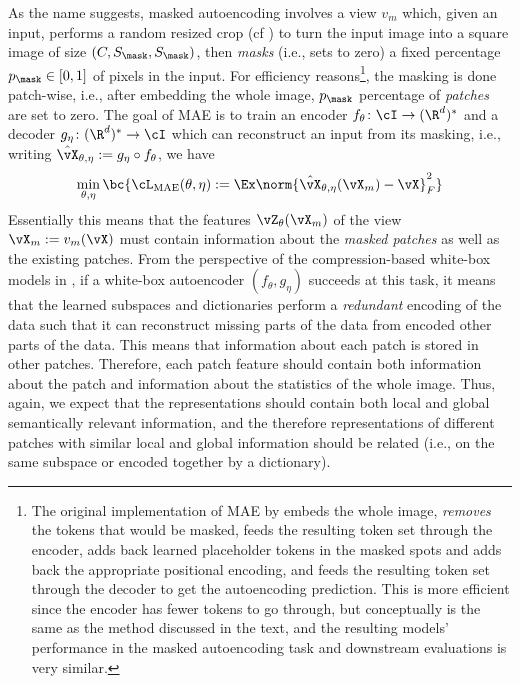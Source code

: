 \documentclass[../../book-main.tex]{subfiles}
\begin{document}
As the name suggests, masked autoencoding involves a view \(v_{m}\) which, given an input, performs a random resized crop (cf ) to turn the input image into a square image of size \((C, S_{\mask}, S_{\mask})\), then \textit{masks} (i.e., sets to zero) a fixed percentage \(p_{\mask} \in [0, 1]\) of pixels in the input. For efficiency reasons\footnote{The original implementation of MAE by \cite{he2022masked} embeds the whole image, \textit{removes} the tokens that would be masked, feeds the resulting token set through the encoder, adds back learned placeholder tokens in the masked spots and adds back the appropriate positional encoding, and feeds the resulting token set through the decoder to get the autoencoding prediction. This is more efficient since the encoder has fewer tokens to go through, but conceptually is the same as the method discussed in the text, and the resulting models' performance in the masked autoencoding task and downstream evaluations is very similar.}, the masking is done patch-wise, i.e.,  after embedding the whole image, \(p_{\mask}\) percentage of \textit{patches} are set to zero. The goal of MAE is to train an encoder \(f_{\theta} \colon \cI \to (\R^{d})^{*}\) and a decoder \(g_{\eta} \colon (\R^{d})^{*} \to \cI\) which can reconstruct an input from its masking, i.e., writing \(\hat{\vX}_{\theta, \eta} := g_{\eta} \circ f_{\theta}\), we have
\begin{equation}
    \min_{\theta, \eta}\bc{\cL_{\mathrm{MAE}}(\theta, \eta) := \Ex\norm{\hat{\vX}_{\theta, \eta}(\vX_{m}) - \vX}_{F}^{2}}
\end{equation}
Essentially this means that the features \(\vZ_{\theta}(\vX_{m})\) of the view \(\vX_{m} := v_{m}(\vX)\) must contain information about the \textit{masked patches} as well as the existing patches. From the perspective of the compression-based white-box models in , if a white-box autoencoder  \((f_{\theta}, g_{\eta})\) succeeds at this task, it means that the learned subspaces and dictionaries perform a \textit{redundant} encoding of the data such that it can reconstruct missing parts of the data from encoded other parts of the data. This means that information about each patch is stored in other patches. Therefore, each patch feature should contain both information about the patch and information about the statistics of the whole image. Thus, again, we expect that the representations should contain both local and global semantically relevant information, and the therefore representations of different patches with similar local and global information should be related (i.e., on the same subspace or encoded together by a dictionary).
\end{document}
